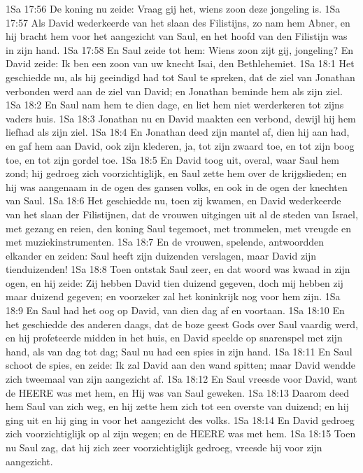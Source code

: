 1Sa 17:56  De koning nu zeide: Vraag gij het, wiens zoon deze jongeling is.
1Sa 17:57  Als David wederkeerde van het slaan des Filistijns, zo nam hem Abner, en hij bracht hem voor het aangezicht van Saul, en het hoofd van den Filistijn was in zijn hand.
1Sa 17:58  En Saul zeide tot hem: Wiens zoon zijt gij, jongeling? En David zeide: Ik ben een zoon van uw knecht Isai, den Bethlehemiet.
1Sa 18:1  Het geschiedde nu, als hij geeindigd had tot Saul te spreken, dat de ziel van Jonathan verbonden werd aan de ziel van David; en Jonathan beminde hem als zijn ziel.
1Sa 18:2  En Saul nam hem te dien dage, en liet hem niet werderkeren tot zijns vaders huis.
1Sa 18:3  Jonathan nu en David maakten een verbond, dewijl hij hem liefhad als zijn ziel.
1Sa 18:4  En Jonathan deed zijn mantel af, dien hij aan had, en gaf hem aan David, ook zijn klederen, ja, tot zijn zwaard toe, en tot zijn boog toe, en tot zijn gordel toe.
1Sa 18:5  En David toog uit, overal, waar Saul hem zond; hij gedroeg zich voorzichtiglijk, en Saul zette hem over de krijgslieden; en hij was aangenaam in de ogen des gansen volks, en ook in de ogen der knechten van Saul.
1Sa 18:6  Het geschiedde nu, toen zij kwamen, en David wederkeerde van het slaan der Filistijnen, dat de vrouwen uitgingen uit al de steden van Israel, met gezang en reien, den koning Saul tegemoet, met trommelen, met vreugde en met muziekinstrumenten.
1Sa 18:7  En de vrouwen, spelende, antwoordden elkander en zeiden: Saul heeft zijn duizenden verslagen, maar David zijn tienduizenden!
1Sa 18:8  Toen ontstak Saul zeer, en dat woord was kwaad in zijn ogen, en hij zeide: Zij hebben David tien duizend gegeven, doch mij hebben zij maar duizend gegeven; en voorzeker zal het koninkrijk nog voor hem zijn.
1Sa 18:9  En Saul had het oog op David, van dien dag af en voortaan.
1Sa 18:10  En het geschiedde des anderen daags, dat de boze geest Gods over Saul vaardig werd, en hij profeteerde midden in het huis, en David speelde op snarenspel met zijn hand, als van dag tot dag; Saul nu had een spies in zijn hand.
1Sa 18:11  En Saul schoot de spies, en zeide: Ik zal David aan den wand spitten; maar David wendde zich tweemaal van zijn aangezicht af.
1Sa 18:12  En Saul vreesde voor David, want de HEERE was met hem, en Hij was van Saul geweken.
1Sa 18:13  Daarom deed hem Saul van zich weg, en hij zette hem zich tot een overste van duizend; en hij ging uit en hij ging in voor het aangezicht des volks.
1Sa 18:14  En David gedroeg zich voorzichtiglijk op al zijn wegen; en de HEERE was met hem.
1Sa 18:15  Toen nu Saul zag, dat hij zich zeer voorzichtiglijk gedroeg, vreesde hij voor zijn aangezicht.

